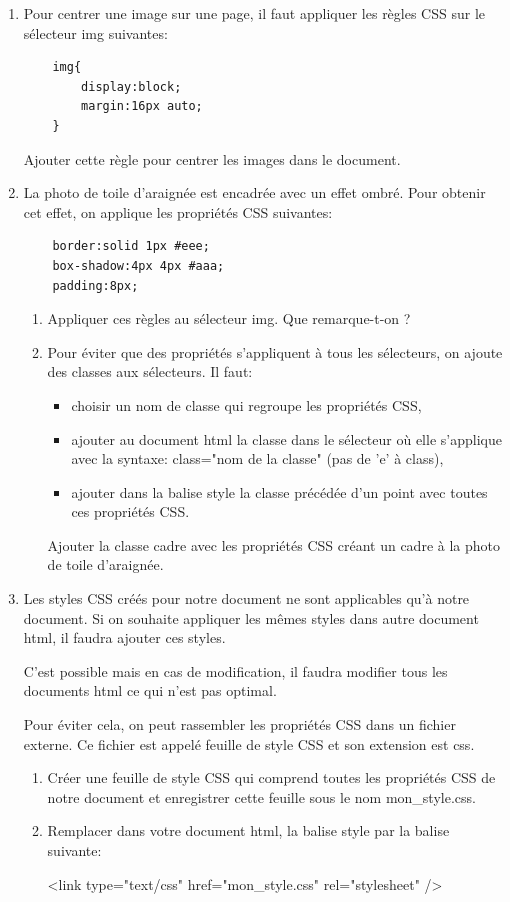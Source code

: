 \documentclass[12pt,a4paper]{article}
\begin{document}
\begin{enumerate}
\item Pour centrer une image sur une page, il faut appliquer les règles CSS sur le sélecteur \textsf{img} suivantes:
\begin{lstlisting}
	img{
		display:block;
		margin:16px auto;
	}
\end{lstlisting}
Ajouter cette règle pour centrer les images dans le document.


\newpage
\item La photo de toile d'araignée est encadrée avec un effet ombré. Pour obtenir cet effet, on applique les propriétés CSS suivantes:
\begin{lstlisting}
	border:solid 1px #eee;
	box-shadow:4px 4px #aaa;
	padding:8px;
\end{lstlisting}
\begin{enumerate}
\item Appliquer ces règles au sélecteur \textsf{img}. Que remarque-t-on ?
\item Pour éviter que des propriétés s'appliquent à tous les sélecteurs, on ajoute des \textsf{classes} aux sélecteurs. Il faut:
\begin{itemize}[label=\textbullet]
\item choisir un nom de classe qui regroupe les propriétés CSS,
\item ajouter au document html la classe dans le sélecteur où elle s'applique avec la syntaxe: \textsf{class="nom de la classe"} (pas de \textsf{'e'} à class),
\item ajouter dans la balise style la classe précédée d'un point avec toutes ces propriétés CSS.
\end{itemize}
Ajouter la classe \textsf{cadre} avec les propriétés CSS créant un cadre à la photo de toile d'araignée.
\end{enumerate}


\item Les styles CSS créés pour notre document ne sont applicables qu'à notre document. Si on souhaite appliquer les mêmes styles dans autre document html, il faudra ajouter ces styles.

C'est possible mais en cas de modification, il faudra modifier tous les documents html ce qui n'est pas optimal.

Pour éviter cela, on peut rassembler les propriétés CSS dans un fichier externe. Ce fichier est appelé feuille de style CSS et son extension est \textsf{css}.

\begin{enumerate}
\item Créer une feuille de style CSS qui comprend toutes les propriétés CSS de notre document et enregistrer cette feuille sous le nom \textsf{mon\_style.css}.
\item Remplacer dans votre document html, la balise \textsf{style} par la balise suivante:
\begin{center}
\textsf{<link type="text/css" href="mon\_style.css" rel="stylesheet" />}
\end{center}
\end{enumerate}


\end{enumerate}
\end{document}
